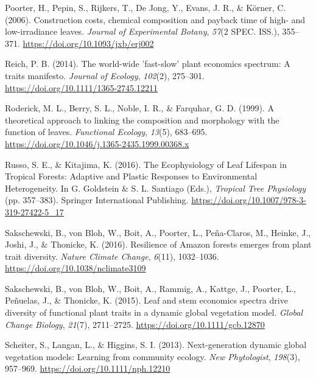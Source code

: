 \documentclass[
  12pt,
  a4paper,
,tablecaptionabove
]{scrartcl}
\newlength{\cslhangindent}
\newenvironment{CSLReferences}[2] %
 {%
  \setlength{\parindent}{0pt}
  \ifodd #1 \everypar{\setlength{\hangindent}{\cslhangindent}}\ignorespaces\fi
  \ifnum #2 > 0
  \setlength{\parskip}{#2\baselineskip}
  \fi
 }%
 {}
\begin{document}
\begin{CSLReferences}{1}{0}
\leavevmode{}%
Poorter, H., Pepin, S., Rijkers, T., De Jong, Y., Evans, J. R., \&
Körner, C. (2006). Construction costs, chemical composition and payback
time of high- and low-irradiance leaves. \emph{Journal of Experimental
Botany}, \emph{57}(2 SPEC. ISS.), 355--371.
\url{https://doi.org/10.1093/jxb/erj002}

\leavevmode{}%
Reich, P. B. (2014). The world-wide 'fast-slow' plant economics
spectrum: {A} traits manifesto. \emph{Journal of Ecology},
\emph{102}(2), 275--301. \url{https://doi.org/10.1111/1365-2745.12211}

\leavevmode{}%
Roderick, M. L., Berry, S. L., Noble, I. R., \& Farquhar, G. D. (1999).
A theoretical approach to linking the composition and morphology with
the function of leaves. \emph{Functional Ecology}, \emph{13}(5),
683--695. \url{https://doi.org/10.1046/j.1365-2435.1999.00368.x}

\leavevmode{}%
Russo, S. E., \& Kitajima, K. (2016). The {Ecophysiology} of {Leaf
Lifespan} in {Tropical Forests}: {Adaptive} and {Plastic Responses} to
{Environmental Heterogeneity}. In G. Goldstein \& S. L. Santiago (Eds.),
\emph{Tropical {Tree Physiology}} (pp. 357--383). {Springer
International Publishing}.
\url{https://doi.org/10.1007/978-3-319-27422-5_17}

\leavevmode{}%
Sakschewski, B., von Bloh, W., Boit, A., Poorter, L., Peña-Claros, M.,
Heinke, J., Joshi, J., \& Thonicke, K. (2016). Resilience of {Amazon}
forests emerges from plant trait diversity. \emph{Nature Climate
Change}, \emph{6}(11), 1032--1036.
\url{https://doi.org/10.1038/nclimate3109}

\leavevmode{}%
Sakschewski, B., von Bloh, W., Boit, A., Rammig, A., Kattge, J.,
Poorter, L., Peñuelas, J., \& Thonicke, K. (2015). Leaf and stem
economics spectra drive diversity of functional plant traits in a
dynamic global vegetation model. \emph{Global Change Biology},
\emph{21}(7), 2711--2725. \url{https://doi.org/10.1111/gcb.12870}

\leavevmode{}%
Scheiter, S., Langan, L., \& Higgins, S. I. (2013). Next-generation
dynamic global vegetation models: {Learning} from community ecology.
\emph{New Phytologist}, \emph{198}(3), 957--969.
\url{https://doi.org/10.1111/nph.12210}


\end{CSLReferences}
\end{document}
